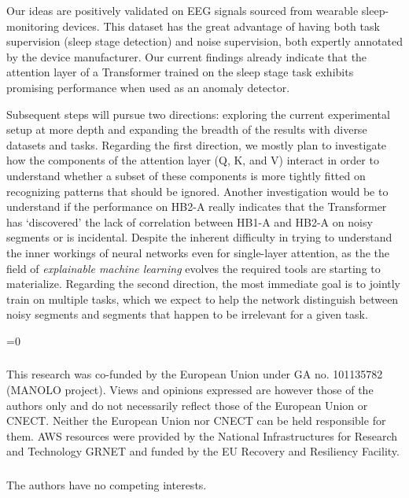 \documentclass[runningheads]{llncs}
\def\anon{1}
\begin{document}
Our ideas are positively validated on EEG signals sourced from
wearable sleep-monitoring devices. This dataset has the great
advantage of having both task supervision (sleep stage detection) and
noise supervision, both expertly annotated by the device manufacturer.
Our current findings already indicate that the attention layer of a
Transformer trained on the sleep stage task exhibits promising
performance when used as an anomaly detector.

Subsequent steps will pursue two directions: exploring the current
experimental setup at more depth and expanding the breadth of the
results with diverse datasets and tasks. Regarding the first direction,
we mostly plan to investigate how the components of the attention
layer (Q, K, and V) interact in order to understand whether a subset 
of these components is more tightly fitted on
recognizing patterns that should be ignored. Another investigation
would be to understand if the performance on HB2-A really indicates
that the Transformer has `discovered' the lack of correlation between
HB1-A and HB2-A on noisy segments or is incidental. Despite the
inherent difficulty in trying to understand the inner workings of
neural networks even for single-layer attention, as the the field
of \emph{explainable machine learning} evolves the required tools
are starting to materialize.
%
Regarding the second direction, the most immediate goal is to jointly
train on multiple tasks, which we expect to help the network
distinguish between noisy segments and segments that happen to be
irrelevant for a given task.


\ifnum\anon=0

\begin{credits}
  
\subsubsection{\ackname} This research was co-funded by the European Union
under GA no. 101135782 (MANOLO project). Views and opinions expressed
are however those of the authors only and do not necessarily reflect
those of the European Union or CNECT. Neither the European Union nor
CNECT can be held responsible for them. AWS resources were provided by
the National Infrastructures for Research and Technology GRNET and
funded by the EU Recovery and Resiliency Facility.

\subsubsection{\discintname} The authors have no competing
interests.
\end{credits}

\fi




\end{document}
